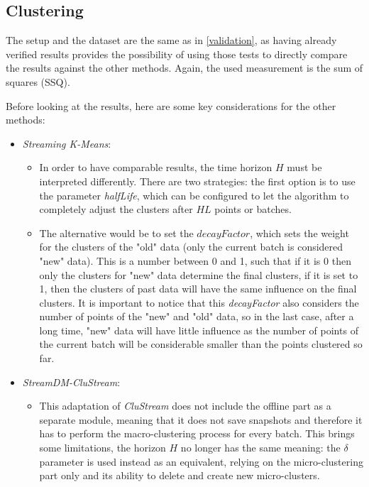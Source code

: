 \documentclass{llncs}
\begin{document}
\subsection{Clustering}

The setup and the dataset are the same as in \ref{validation}, as having already verified results provides the possibility of using those tests to directly compare the results against the other methods. Again, the used measurement is the sum of squares (SSQ).

Before looking at the results, here are some key considerations for the other methods:

\begin{itemize}
 \item \textit{Streaming K-Means}:
 \begin{itemize}
  \item In order to have comparable results, the time horizon $H$ must be interpreted differently. There are two strategies: the first option is to use the parameter \textit{halfLife}, which can be configured to let the algorithm to completely adjust the clusters after $HL$ points or batches.
  \item The alternative would be to set the $decayFactor$, which sets the weight for the clusters of the "old" data (only the current batch is considered "new" data). This is a number between 0 and 1, such that if it is 0 then only the clusters for "new" data determine the final clusters, if it is set to 1, then the clusters of past data will have the same influence on the final clusters. It is important to notice that this \textit{decayFactor} also considers the number of points of the "new" and "old" data, so in the last case, after a long time, "new" data will have little influence as the number of points of the current batch will be considerable smaller than the points clustered so far.
 \end{itemize}
 \item \textit{StreamDM-CluStream}:
 \begin{itemize}
  \item This adaptation of \textit{CluStream} does not include the offline part as a separate module, meaning that it does not save snapshots and therefore it has to perform the macro-clustering process for every batch. This brings some limitations, the horizon $H$ no longer has the same meaning: the $\delta$ parameter is used instead as an equivalent, relying on the micro-clustering part only and its ability to delete and create new micro-clusters.
\end{itemize}

\end{itemize}
\end{document}
